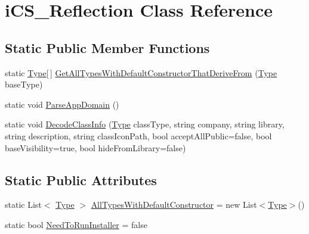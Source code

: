 \hypertarget{classi_c_s___reflection}{\section{i\+C\+S\+\_\+\+Reflection Class Reference}
\label{classi_c_s___reflection}
}
\subsection*{Static Public Member Functions}
\begin{DoxyCompactItemize}
\item 
static \hyperlink{i_c_s___object_type_enum_8cs_ae6c3dd6d8597380b56d94908eb431547aa1fa27779242b4902f7ae3bdd5c6d508}{Type}\mbox{[}$\,$\mbox{]} \hyperlink{classi_c_s___reflection_ad0044c47d40122690555d4406b461334}{Get\+All\+Types\+With\+Default\+Constructor\+That\+Derive\+From} (\hyperlink{i_c_s___object_type_enum_8cs_ae6c3dd6d8597380b56d94908eb431547aa1fa27779242b4902f7ae3bdd5c6d508}{Type} base\+Type)
\item 
static void \hyperlink{classi_c_s___reflection_ab02dc79b1a7bdf82b06baf03b84e16a4}{Parse\+App\+Domain} ()
\item 
static void \hyperlink{classi_c_s___reflection_aeb81d49966ab980c1d5f4b172c8bf104}{Decode\+Class\+Info} (\hyperlink{i_c_s___object_type_enum_8cs_ae6c3dd6d8597380b56d94908eb431547aa1fa27779242b4902f7ae3bdd5c6d508}{Type} class\+Type, string company, string library, string description, string class\+Icon\+Path, bool accept\+All\+Public=false, bool base\+Visibility=true, bool hide\+From\+Library=false)
\end{DoxyCompactItemize}
\subsection*{Static Public Attributes}
\begin{DoxyCompactItemize}
\item 
static List$<$ \hyperlink{i_c_s___object_type_enum_8cs_ae6c3dd6d8597380b56d94908eb431547aa1fa27779242b4902f7ae3bdd5c6d508}{Type} $>$ \hyperlink{classi_c_s___reflection_a56ed452f217e6f291258e0f689491d98}{All\+Types\+With\+Default\+Constructor} = new List$<$\hyperlink{i_c_s___object_type_enum_8cs_ae6c3dd6d8597380b56d94908eb431547aa1fa27779242b4902f7ae3bdd5c6d508}{Type}$>$()
\item 
static bool \hyperlink{classi_c_s___reflection_a17d9923084e2cb7775485016ced195b3}{Need\+To\+Run\+Installer} = false
\end{DoxyCompactItemize}


